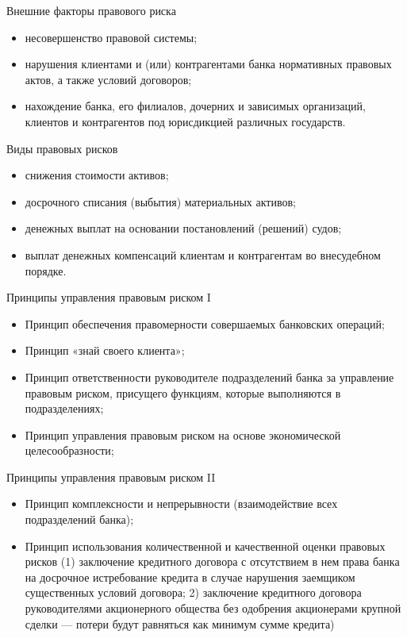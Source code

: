 \documentclass[financial_risks_lectures.tex]{subfiles}
\begin{document}
\begin{frame}{Внешние факторы правового риска}
\begin{itemize}[<+->]
\item
несовершенство правовой системы;
\item
нарушения клиентами и (или) контрагентами банка нормативных правовых актов, а также условий договоров;
\item
нахождение банка, его филиалов, дочерних и зависимых организаций, клиентов и контрагентов под юрисдикцией различных государств.
\end{itemize}
\end{frame}

\begin{frame}{Виды правовых рисков}
\begin{itemize}[<+->]
\item
снижения стоимости активов;
\item
досрочного списания (выбытия) материальных активов;
\item
денежных выплат на основании постановлений (решений) судов;
\item
выплат денежных компенсаций клиентам и контрагентам во внесудебном порядке.
\end{itemize}
\end{frame}
\begin{frame}{Принципы управления правовым риском I}
\begin{itemize}[<+->]
\item
Принцип обеспечения правомерности совершаемых банковских операций;
\item
Принцип «знай своего клиента»;
\item
Принцип ответственности руководителе подразделений банка за управление правовым риском, присущего функциям, которые выполняются в подразделениях;
\item
Принцип управления правовым риском на основе экономической целесообразности;
\end{itemize}
\end{frame}
\begin{frame}{Принципы управления правовым риском II}
\begin{itemize}[<+->]
\item
Принцип комплексности и непрерывности (взаимодействие всех подразделений банка);
\item
Принцип использования количественной и качественной оценки правовых рисков (1) заключение кредитного договора с отсутствием в нем права банка на досрочное истребование кредита в случае нарушения заемщиком существенных условий договора; 2) заключение кредитного договора руководителями акционерного общества без одобрения акционерами крупной сделки — потери будут равняться как минимум сумме кредита)
\end{itemize}
\end{frame}
\end{document}
